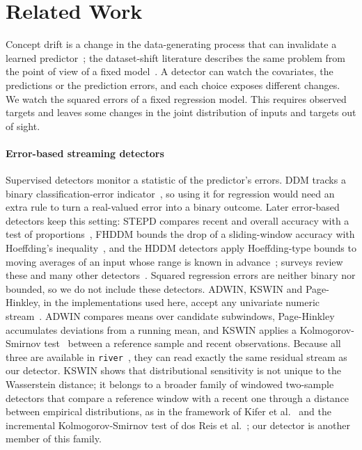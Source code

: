 \documentclass[preprint,12pt]{elsarticle}
\begin{document}
\section{Related Work}
\label{sec:related}
Concept drift is a change in the data-generating process that can invalidate a learned predictor~\cite{gama2004,webb2016,lu2018,hovakimyan2024}; the dataset-shift literature describes the same problem from the point of view of a fixed model~\cite{QuioneroCandela2009DatasetSI}. A detector can watch the covariates, the predictions or the prediction errors, and each choice exposes different changes. We watch the squared errors of a fixed regression model. This requires observed targets and leaves some changes in the joint distribution of inputs and targets out of sight.

\paragraph{Error-based streaming detectors} Supervised detectors monitor a statistic of the predictor's errors. DDM tracks a binary classification-error indicator~\cite{gama2004}, so using it for regression would need an extra rule to turn a real-valued error into a binary outcome. Later error-based detectors keep this setting: STEPD compares recent and overall accuracy with a test of proportions~\cite{nishida2007stepd}, FHDDM bounds the drop of a sliding-window accuracy with Hoeffding's inequality~\cite{pesaranghader2016fhddm}, and the HDDM detectors apply Hoeffding-type bounds to moving averages of an input whose range is known in advance~\cite{frias2015hddm}; surveys review these and many other detectors~\cite{gama2014survey,lu2018}. Squared regression errors are neither binary nor bounded, so we do not include these detectors. ADWIN, KSWIN and Page-Hinkley, in the implementations used here, accept any univariate numeric stream~\cite{bifet2007,raab2020,page1954,hinkley1971}. ADWIN compares means over candidate subwindows, Page-Hinkley accumulates deviations from a running mean, and KSWIN applies a Kolmogorov-Smirnov test~\cite{massey1951kolmogorov} between a reference sample and recent observations. Because all three are available in \texttt{river}~\cite{montiel2021}, they can read exactly the same residual stream as our detector. KSWIN shows that distributional sensitivity is not unique to the Wasserstein distance; it belongs to a broader family of windowed two-sample detectors that compare a reference window with a recent one through a distance between empirical distributions, as in the framework of Kifer et al.~\cite{kifer2004detecting} and the incremental Kolmogorov-Smirnov test of dos Reis et al.~\cite{dosreis2016fast}; our detector is another member of this family.
\end{document}
